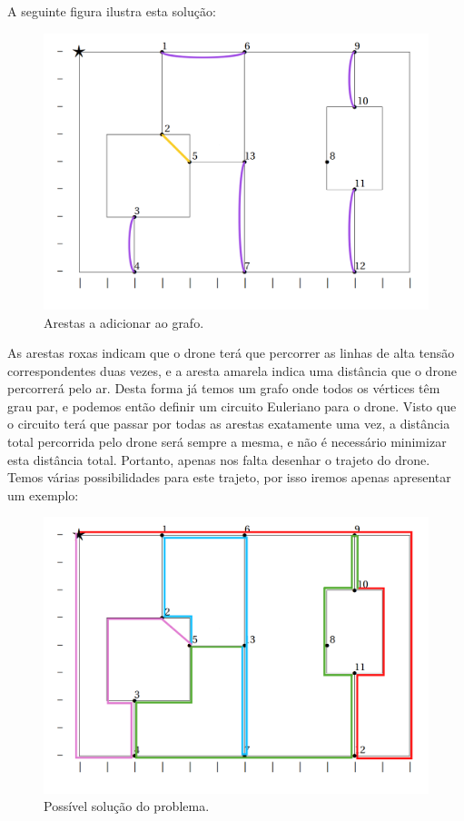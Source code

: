\documentclass{article}
\begin{document}
A seguinte figura ilustra esta solução: 

\begin{figure}[H]
    \centering
    \includegraphics[width=0.8\linewidth]{fig4.png}
    \caption{Arestas a adicionar ao grafo.}
    \label{fig:arestas}
\end{figure}

As arestas roxas indicam que o drone terá que percorrer as linhas de alta tensão correspondentes duas vezes, e a aresta amarela indica uma distância que o drone percorrerá pelo ar. Desta forma já temos um grafo onde todos os vértices têm grau par, e podemos então definir um circuito Euleriano para o drone. Visto que o circuito terá que passar por todas as arestas exatamente uma vez, a distância total percorrida pelo drone será sempre a mesma, e não é necessário minimizar esta distância total. Portanto, apenas nos falta desenhar o trajeto do drone. Temos várias possibilidades para este trajeto, por isso iremos apenas apresentar um exemplo:

\begin{figure}[H]
    \centering
    \includegraphics[width=0.8\linewidth]{fig5.png}
    \caption{Possível solução do problema.}
    \label{fig:solucao}
\end{figure}
\end{document}
